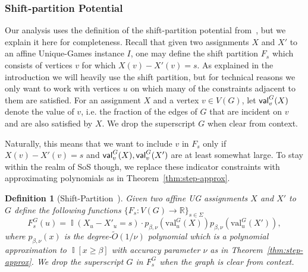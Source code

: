 \documentclass[11pt]{article}
\DeclareMathOperator*{\Ind}{\mathbb{I}}
\def \R {\mathbb{R}}
\def \sos {SoS\xspace}
\def \eps {{\varepsilon}}
\def \val {\mathrm{val}}
\newtheorem{definition}[theorem]{Definition}
\theoremstyle{definition}
\begin{document}
\subsubsection{Shift-partition Potential~\cite{BBKSS}}
Our analysis uses the definition of the shift-partition potential from~\cite{BBKSS}, but we explain it here for completeness. 
Recall that given two assignments $X$ and 
$X'$ to an affine Unique-Games instance $I$, 
one may define the shift partition 
$F_s$ which consists of vertices $v$ for 
which $X(v) - X'(v) = s$. As explained 
in the introduction we will heavily use the shift partition, but for 
technical reasons we only want to work with vertices $u$ on which many of the constraints adjacent to them are satisfied. For an assignment $X$ and a vertex $v \in V(G)$, let ${\sf val}_v^G(X)$ denote the value of $v$, i.e. the fraction of the edges of $G$ that are incident on $v$ and are also satisfied by $X$. We drop the superscript $G$ when clear from context.

Naturally, 
this means that we want to include $v$ in $F_s$ only if $X(v) - X'(v) = s$ and ${\sf val}^G_v(X), {\sf val}^G_v(X')$ are at least 
somewhat large. To stay within the realm of
\sos though, we replace these indicator constraints with approximating polynomials 
as in Theorem~\ref{thm:step-approx}.


\begin{definition}[Shift-Partition~\cite{BBKSS}]
Given two affine UG assignments $X$ and $X'$ to $G$ define the following functions $\{F_s:V(G) \to \R\}_{s \in \Sigma}$ \begin{equation}
F_{s}^G(u) = \Ind(X_u - X'_u = s) \cdot p_{\beta,\nu}(\val^{G}_u(X))p_{\beta,\nu}(\val_u^{G}(X')),\label{eq:fs-j}
\end{equation}
where $p_{\beta,\nu}(x)$ is the degree-$\tilde{O}(1/\nu)$ polynomial which is a polynomial approximation to $\Ind[x \geq \beta]$ with accuracy parameter $\nu$ as in Theorem~\ref{thm:step-approx}. We drop the superscript $G$ in $F_s^G$ when the graph is clear from context.
\end{definition}

\end{document}

